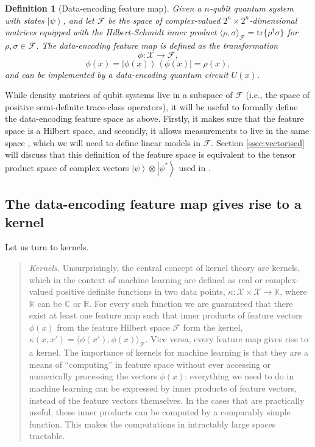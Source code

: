 \documentclass[aps, reprint, onecolumn, nofootinbib, longbibliography]{revtex4-2}
\newtheorem{definition}{Definition}[]
\newcommand{\ket}[1]{\ensuremath{\left| #1 \right \rangle}}
\newcommand{\bra}[1]{\ensuremath{\left \langle #1 \right |}}
\newcommand{\ketbra}[2]{\ket{#1}\!\bra{#2}}
\begin{document}
\begin{definition}[Data-encoding feature map]\label{def:data_enc_feat_map}
Given a $n$-qubit quantum system with states $\ket{\psi}$, and let $\mathcal{F}$ be the space of complex-valued $2^n \times 2^n$-dimensional matrices equipped with the Hilbert-Schmidt inner product $\langle \rho, \sigma \rangle_{\mathcal{F}} = \mathrm{tr} \{ \rho^{\dagger} \sigma \}$ for $\rho, \sigma \in \mathcal{F}$. The data-encoding feature map is defined as the transformation 
\begin{equation}
    \phi: \mathcal{X} \rightarrow \mathcal{F},
\end{equation}
\begin{equation} 
    \phi(x) = \ketbra{\phi(x)}{\phi(x)} = \rho(x),
\end{equation}
and can be implemented by a data-encoding quantum circuit $U(x)$.
\end{definition}
While density matrices of qubit systems live in a subspace of $\mathcal{F}$ (i.e., the space of positive semi-definite trace-class  operators), it will be useful to formally define the data-encoding feature space as above. Firstly, it makes sure that the feature space is a Hilbert space, and secondly, it allows measurements to live in the same space \cite{wolf}, which we will need to define linear models in $\mathcal{F}$. Section \ref{ssec:vectorised} will discuss that this definition of the feature space is equivalent to the tensor product space of complex vectors $\ket{\psi} \otimes \ket{\psi^*}$ used in \cite{huang2020power}.

\subsection{The data-encoding feature map gives rise to a kernel}

Let us turn to kernels.

\begin{quote}
    \textit{Kernels.} Unsurprisingly, the central concept of kernel theory are kernels, which in the context of machine learning are defined as real or complex-valued positive definite functions in two data points, $\kappa: \mathcal{X}\times \mathcal{X} \rightarrow \mathbb{K}$, where $\mathbb{K}$ can be $\mathbb{C} \text{ or }\mathbb{R}$. For every such function we are guaranteed that there exist at least one feature map such that inner products of feature vectors $\phi(x)$ from the feature Hilbert space $\mathcal{F}$ form the kernel, $\kappa(x, x') = \langle \phi(x'), \phi(x) \rangle_{\mathcal{F}}$. Vice versa, every feature map gives rise to a kernel. The importance of kernels for machine learning is that they are a means of ``computing'' in feature space without ever accessing or numerically processing the vectors $\phi(x)$: everything we need to do in machine learning can be expressed by inner products of feature vectors, instead of the feature vectors themselves. In the cases that are practically useful, these inner products can be computed by a comparably simple function. This makes the computations in intractably large spaces tractable.
\end{quote}
\end{document}
